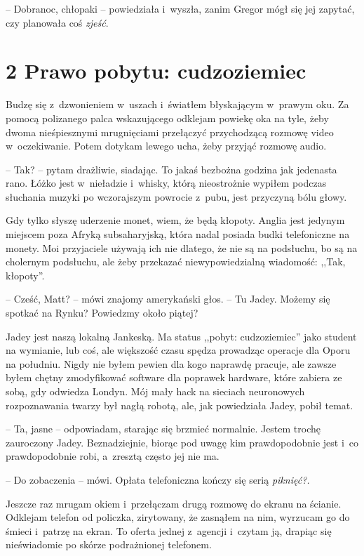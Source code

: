 \documentclass[oneside,polish,12pt,sfheadings]{mwbk}
\begin{document}
-- Dobranoc, chłopaki -- powiedziała i~wyszła, zanim Gregor mógł się jej
zapytać, czy planowała coś \emph{zjeść}.

\chapter[Prawo pobytu: cudzoziemiec]{2 Prawo pobytu: cudzoziemiec}

Budzę się z~dzwonieniem w~uszach i~światłem błyskającym w~prawym oku. Za
pomocą polizanego palca wskazującego odklejam powiekę oka na tyle, żeby
dwoma nieśpiesznymi mrugnięciami przełączyć przychodzącą rozmowę video w~oczekiwanie. Potem dotykam lewego ucha, żeby przyjąć rozmowę audio.

-- Tak? -- pytam drażliwie, siadając. To jakaś bezbożna godzina jak
jedenasta rano. Łóżko jest w~nieładzie i~whisky, którą nieostrożnie
wypiłem podczas słuchania muzyki po wczorajszym powrocie z~pubu, jest
przyczyną bólu głowy.

Gdy tylko słyszę uderzenie monet, wiem, że będą kłopoty. Anglia jest
jedynym miejscem poza Afryką subsaharyjską, która nadal posiada budki
telefoniczne na monety. Moi przyjaciele używają ich nie dlatego, że nie
są na podsłuchu, bo są na cholernym podsłuchu, ale żeby przekazać
niewypowiedzialną wiadomość: ,,Tak, kłopoty''.

-- Cześć, Matt? -- mówi znajomy amerykański głos. -- Tu Jadey. Możemy się
spotkać na Rynku? Powiedzmy około piątej?

Jadey jest naszą lokalną Jankeską. Ma status ,,pobyt: cudzoziemiec'' jako
student na wymianie, lub coś, ale większość czasu spędza prowadząc
operacje dla Oporu na południu. Nigdy nie byłem pewien dla kogo naprawdę
pracuje, ale zawsze byłem chętny zmodyfikować software dla poprawek
hardware, które zabiera ze sobą, gdy odwiedza Londyn. Mój mały hack na
sieciach neuronowych rozpoznawania twarzy był nagłą robotą, ale, jak
powiedziała Jadey, pobił temat.

-- Ta, jasne -- odpowiadam, starając się brzmieć normalnie. Jestem trochę
zauroczony Jadey. Beznadziejnie, biorąc pod uwagę kim prawdopodobnie
jest i~co prawdopodobnie robi, a~zresztą często jej nie ma.

-- Do zobaczenia -- mówi. Opłata telefoniczna kończy się serią
\emph{piknięć?.}

Jeszcze raz mrugam okiem i~przełączam drugą rozmowę do ekranu na
ścianie. Odklejam telefon od policzka, zirytowany, że zasnąłem na nim,
wyrzucam go do śmieci i~patrzę na ekran. To oferta jednej z~agencji i~czytam ją, drapiąc się nieświadomie po skórze podrażnionej telefonem.
\end{document}
